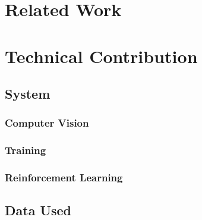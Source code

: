 \documentclass{article}
\begin{document}
\section{Related Work}

\section{Technical Contribution}

\subsection{System}

\subsubsection{Computer Vision}
\subsubsection{Training}
\subsubsection{Reinforcement Learning}


\subsection{Data Used}
\end{document}

